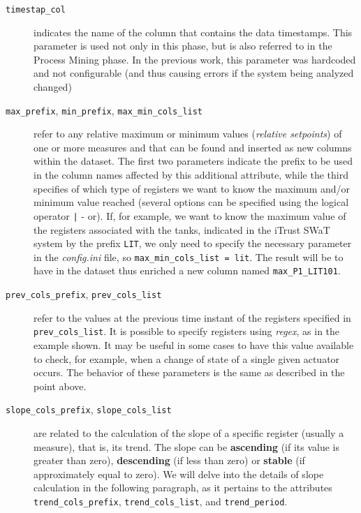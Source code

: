 \begin{description}
	\item[\texttt{timestap\_col}] indicates the name of the column that contains the data timestamps. This parameter is used not only in this phase, but is also referred to in the Process Mining phase. In the previous work, this parameter was hardcoded and not configurable (and thus causing errors if the system being analyzed changed)
	
	\item[\texttt{max\_prefix}, \texttt{min\_prefix}, \texttt{max\_min\_cols\_list}] refer to any relative maximum or minimum values (\textit{relative setpoints}) of one or more measures and that can be found and inserted as new columns within the dataset. The first two parameters indicate the prefix to be used in the column names affected by this additional attribute, while the third specifies of which type of registers we want to know the maximum and/or minimum value reached (several options can be specified using the logical operator \texttt{|} - or).\newline 
	If, for example, we want to know the maximum value of the registers associated with the tanks, indicated in the iTrust SWaT system by the prefix \texttt{LIT}, we only need to specify the necessary parameter in the \textit{config.ini} file, so \texttt{max\_min\_cols\_list = lit}.\newline
	The result will be to have in the dataset thus enriched a new column named \texttt{max\_P1\_LIT101}.
	
	\item[\texttt{prev\_cols\_prefix}, \texttt{prev\_cols\_list}]  refer to the values at the previous time instant of the registers specified in \texttt{prev\_cols\_list}. It is possible to specify registers using \textit{regex}, as in the example shown. It may be useful in some cases to have this value available to check, for example, when a change of state of a single given actuator occurs.  The behavior of these parameters is the same as described in the point above.
	
	\item[\texttt{slope\_cols\_prefix}, \texttt{slope\_cols\_list}] are related to the calculation of the slope of a specific register (usually a measure), that is, its trend. The slope can be \textbf{ascending} (if its value is greater than zero), \textbf{descending} (if less than zero) or \textbf{stable} (if approximately equal to zero). We will delve into the details of slope calculation in the following paragraph, as it pertains to the attributes \texttt{trend\_cols\_prefix}, \texttt{trend\_cols\_list}, and \texttt{trend\_period}.
\end{description}

